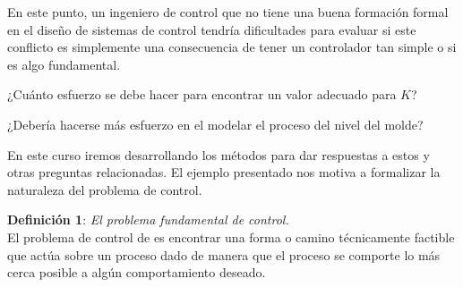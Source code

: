 \documentclass[a4paper]{article}
\begin{document}
En este punto, un ingeniero de control  que no tiene una buena formación formal en el diseño de sistemas de control tendría dificultades para evaluar si este conflicto es simplemente una consecuencia  de tener un controlador tan simple o si es algo fundamental.

¿Cuánto esfuerzo se debe hacer para encontrar un valor adecuado para $K$?

¿Debería hacerse más esfuerzo en el modelar el proceso del nivel del molde?

En este curso iremos desarrollando los métodos para dar respuestas a estos y otras preguntas relacionadas. El ejemplo presentado nos motiva a formalizar la naturaleza del problema de control.

\vspace{1mm}
\textbf{Definición 1}: \textit{El problema fundamental de control.}
\vspace{1mm}
\\
El problema de control de es encontrar una forma o camino técnicamente factible que actúa sobre un proceso dado de manera que el proceso se comporte lo más cerca posible a algún comportamiento deseado.
\end{document}

